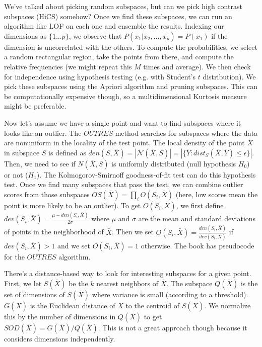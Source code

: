 \documentclass[a4paper]{article}
\begin{document}
We've talked about picking random subspaces, but can we pick high contrast
subspaces (HiCS) somehow? Once we find these subspaces, we can run an algorithm
like LOF on each one and ensemble the results. Indexing our dimensions as
$\{1...p\}$, we observe that $P(x_1 | x_2, ..., x_p) = P(x_1)$ if the dimension
is uncorrelated with the others. To compute the probabilities, we select a
random rectangular region, take the points from there, and compute the
relative frequencies (we might repeat this $M$ times and average). We then check
for independence using hypothesis testing (e.g. with Student's $t$
distribution). We pick these subspaces using the Apriori algorithm and pruning
subspaces. This can be computationally expensive though, so a multidimensional
Kurtosis measure might be preferable.

Now let's assume we have a single point and want to find subspaces where it
looks like an outlier. The $OUTRES$ method searches for subspaces where the
data are nonuniform in the locality of the test point. The local density of the
point $\bar{X}$ in subspace $S$ is defined as $den(S, \bar{X}) = |\mathcal{N}(
\bar{X}, S)| = |\{\bar{Y} : dist_S(\bar{X}, \bar{Y}) \leq \epsilon\}|$. Then,
we need to see if $N(\bar{X}, S)$ is uniformly distributed (null hypothesis
$H_0$) or not ($H_1$). The Kolmogorov-Smirnoff goodness-of-fit test can do
this hypothesis test. Once we find many subspaces that pass the test, we can
combine outlier scores from those subspaces $OS(\bar{X}) = \prod_{i}{O(S_i,
\bar{X})}$ (here, low scores mean the point is more likely to be an outlier).
To get $O(S_i, \bar{X})$, we first define $dev(S_i, \bar{X}) = \frac{\mu -
den(S_i, \bar{X})}{2 \sigma}$ where $\mu$ and $\sigma$ are the mean and standard
deviations of points in the neighborhood of $\bar{X}$. Then we set
$O(S_i, \bar{X}) = \frac{den(S_i, \bar{X})}{dev(S_i, \bar{X})}$ if $dev(S_i,
\bar{X}) > 1$ and we set $O(S_i, \bar{X}) = 1$ otherwise. The book has
pseudocode for the $OUTRES$ algorithm.

There's a distance-based way to look for interesting subspaces for a given
point. First, we let $S(\bar{X})$ be the $k$ nearest neighbors of $\bar{X}$.
The subspace $Q(\bar{X})$ is the set of dimensions of $S(\bar{X})$ where
variance is small (according to a threshold). $G(\bar{X})$ is the Euclidean
distance of $\bar{X}$ to the centroid of $S(\bar{X})$. We normalize this by
the number of dimensions in $Q(\bar{X})$ to get $SOD(\bar{X}) = G(\bar{X})/
Q(\bar{X})$. This is not a great approach though because it considers dimensions
independently.
\end{document}

